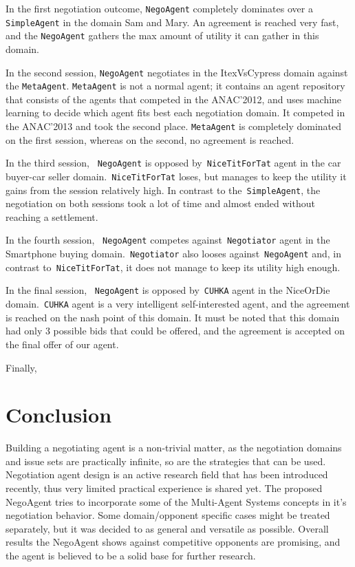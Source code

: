 \documentclass[html]{report}    %
\begin{document}
In the first negotiation outcome, \texttt{NegoAgent} completely dominates over a \texttt{SimpleAgent}  in the domain Sam and Mary. An agreement is reached very fast, and the \texttt{NegoAgent} gathers the max amount of utility it can gather in this domain. 

In the second session, \texttt{NegoAgent} negotiates in the ItexVsCypress domain against the \texttt{MetaAgent}. \texttt{MetaAgent} is not a normal agent; it contains an agent repository that consists of the agents that competed in the ANAC'2012, and uses machine learning to decide which agent fits best each negotiation domain. It competed in the ANAC'2013 and took the second place. \texttt{MetaAgent} is completely dominated on the first session, whereas on the second, no agreement is reached.

In the third session, ~\texttt{NegoAgent} is opposed by~\texttt{NiceTitForTat} agent in the car buyer-car seller domain.~\texttt{NiceTitForTat} loses, but manages to keep the utility it gains from the session relatively high. In contrast to the~\texttt{SimpleAgent}, the negotiation on both sessions took a lot of time and almost ended without reaching a settlement.

In the fourth session, ~\texttt{NegoAgent} competes against~\texttt{Negotiator} agent in the Smartphone buying domain.~\texttt{Negotiator} also looses against~\texttt{NegoAgent} and, in contrast to~\texttt{NiceTitForTat}, it does not manage to keep its utility high enough.

In the final session, ~\texttt{NegoAgent} is opposed by~\texttt{CUHKA} agent in the NiceOrDie domain.~\texttt{CUHKA} agent is a very intelligent self-interested agent, and the agreement is reached on the nash point of this domain. It must be noted that this domain had only 3 possible bids that could be offered, and the agreement is accepted on the final offer of our agent.

Finally, 

\section{Conclusion}
Building a negotiating agent is a non-trivial matter, as the negotiation domains and issue sets are practically infinite, so are the strategies that can be used. Negotiation agent design is an active research field that has been introduced recently, thus very limited practical experience is shared yet. The proposed NegoAgent tries to incorporate some of the Multi-Agent Systems concepts in it's negotiation behavior. Some domain/opponent specific cases might be treated separately, but it was decided to as general and versatile as possible. Overall results the NegoAgent shows against competitive opponents are promising, and the agent is believed to be a solid base for further research. 
\end{document}
